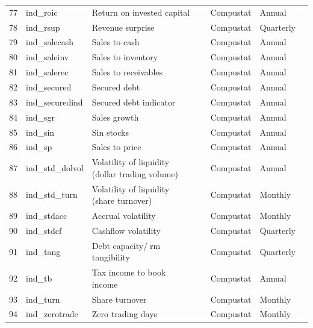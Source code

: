 \documentclass[11pt, a4paper, table]{article}
\begin{document}
\begin{landscape}
\begin{center}
\begin{longtable}{lllllll}
			77 & ind\_roic & Return on invested capital & 
				\cite{brown_productivity_2007} & Compustat & Annual \\
			78 & ind\_rsup & Revenue surprise & 
				\cite{kama_market_2009} & Compustat & Quarterly \\
			79 & ind\_salecash & Sales to cash & 
				\cite{ou_financial_1989} & Compustat & Annual \\
			80 & ind\_saleinv\footnotemark[\value{footnote}] & Sales to inventory & 
				\cite{ou_financial_1989} & Compustat & Annual \\
			81 & ind\_salerec & Sales to receivables & 
				\cite{ou_financial_1989} & Compustat & Annual \\
			82 & ind\_secured\footnotemark[\value{footnote}] & Secured debt & 
				\cite{valta_strategic_2016} & Compustat & Annual \\
			83 & ind\_securedind & Secured debt indicator & 
				\cite{valta_strategic_2016} & Compustat & Annual \\
			84 & ind\_sgr\footnotemark[\value{footnote}] & Sales growth & 
				\cite{barbee_jr_salesprice_1996} & Compustat & Annual \\
			85 & ind\_sin & Sin stocks & 
				\cite{hong_price_2009} & Compustat & Annual \\
			86 & ind\_sp & Sales to price & 
				\cite{barbee_jr_salesprice_1996} & Compustat & Annual \\
			87 & ind\_std\_dolvol & Volatility of liquidity (dollar trading volume) & 
				\cite{chordia_trading_2001} & Compustat & Annual \\
			88 & ind\_std\_turn & Volatility of liquidity (share turnover) & 
				\cite{chordia_trading_2001} & Compustat & Monthly \\
			89 & ind\_stdacc\footnotemark[\value{footnote}] & Accrual volatility & 
				\cite{bandyopadhyay_accrual_2010} & Compustat & Monthly \\
			90 & ind\_stdcf\footnotemark[\value{footnote}] & Cashflow volatility & 
				\cite{huang_cross_2009} & Compustat & Quarterly \\
			91 & ind\_tang & Debt capacity/rm tangibility & 
				\cite{almeida_financial_2007} & Compustat & Quarterly \\
			92 & ind\_tb\footnotemark[\value{footnote}] & Tax income to book income & 
				\cite{lev_market-based_1982} & Compustat & Annual \\
			93 & ind\_turn & Share turnover & 
				\cite{datar_liquidity_1998} & Compustat & Monthly \\
			94 & ind\_zerotrade & Zero trading days & 
				\cite{liu_liquidity-augmented_2006} & Compustat & Monthly \\ \hline	
		\end{longtable}
	\end{center}
\end{landscape}
\end{document}

